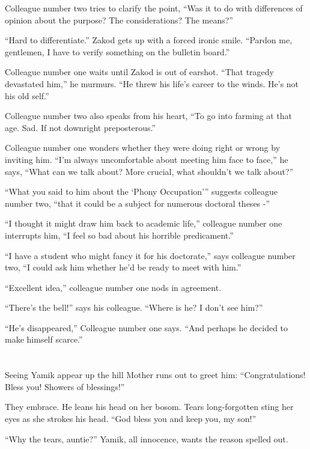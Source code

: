 \documentclass[twoside,11pt]{book}
\begin{document}
Colleague number two tries to clarify the point, ``Was it to do with differences of opinion about the
purpose? The considerations? The means?''

``Hard to differentiate.'' Zakod gets up with a forced ironic smile. ``Pardon me,
gentlemen, I have to verify something on the bulletin board.''

Colleague number one waits until Zakod is out of earshot. ``That tragedy devastated him,'' he
murmurs. ``He threw his life's career to the winds. He's not his old self.''

Colleague number two also speaks from his heart, ``To go into farming at that age. Sad. If not downright
preposterous.''

Colleague number one wonders whether they were doing right or wrong by inviting him. ``I'm always uncomfortable
about meeting him face to face,'' he says, ``What can we talk about? More crucial, what shouldn't we talk
about?''

``What you said to him about the `Phony Occupation'\thinspace'' suggests colleague number two, ``that it could be a
subject for numerous doctoral theses -''

``I thought it might draw him back to academic life,'' colleague number one interrupts him, ``I feel so bad
about his horrible predicament.''

``I have a student who might fancy it for his doctorate,'' says colleague number two, ``I could ask him
whether he'd be ready to meet with him.''

``Excellent idea,'' colleague number one nods in agreement.

``There's the bell!'' says his colleague. ``Where is he? I don't see him?''

``He's disappeared,'' Colleague number one says. ``And perhaps he decided to make himself
scarce.''


\bigskip

\chapter{}

Seeing Yamik appear up the hill Mother runs out to greet him: ``Congratulations! Bless you! Showers of
blessings!''

They embrace. He leans his head on her bosom. Tears long-forgotten sting her eyes as she strokes his head.
``God bless you and keep you, my son!''

``Why the tears, auntie?'' Yamik, all innocence, wants the reason spelled out.
\end{document}
